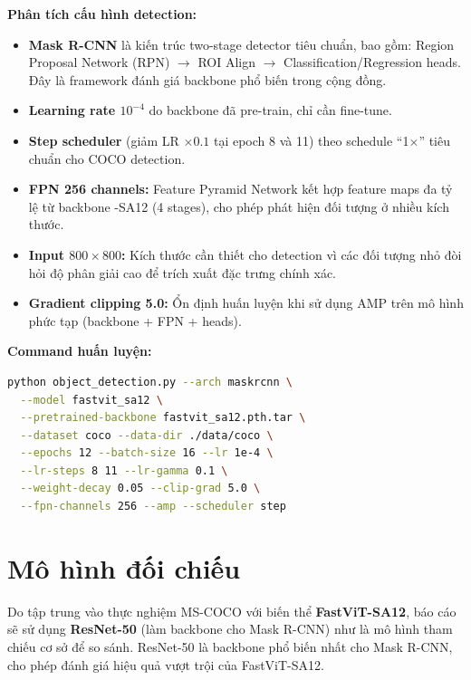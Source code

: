 \textbf{Phân tích cấu hình detection:}
\begin{itemize}
    \item \textbf{Mask R-CNN} là kiến trúc two-stage detector tiêu chuẩn, bao gồm: Region Proposal Network (RPN) $\to$ ROI Align $\to$ Classification/Regression heads. Đây là framework đánh giá backbone phổ biến trong cộng đồng.
    
    \item \textbf{Learning rate $10^{-4}$} do backbone đã pre-train, chỉ cần fine-tune.
    
    \item \textbf{Step scheduler} (giảm LR $\times 0.1$ tại epoch 8 và 11) theo schedule ``1$\times$'' tiêu chuẩn cho COCO detection.
    
    \item \textbf{FPN 256 channels:} Feature Pyramid Network kết hợp feature maps đa tỷ lệ từ backbone \fastvit{}-SA12 (4 stages), cho phép phát hiện đối tượng ở nhiều kích thước.
    
    \item \textbf{Input $800 \times 800$:} Kích thước cần thiết cho detection vì các đối tượng nhỏ đòi hỏi độ phân giải cao để trích xuất đặc trưng chính xác.
    
    \item \textbf{Gradient clipping 5.0:} Ổn định huấn luyện khi sử dụng AMP trên mô hình phức tạp (backbone + FPN + heads).
\end{itemize}

\textbf{Command huấn luyện:}
\begin{lstlisting}[language=bash, basicstyle=\ttfamily\scriptsize, breaklines=true]
python object_detection.py --arch maskrcnn \
  --model fastvit_sa12 \
  --pretrained-backbone fastvit_sa12.pth.tar \
  --dataset coco --data-dir ./data/coco \
  --epochs 12 --batch-size 16 --lr 1e-4 \
  --lr-steps 8 11 --lr-gamma 0.1 \
  --weight-decay 0.05 --clip-grad 5.0 \
  --fpn-channels 256 --amp --scheduler step
\end{lstlisting}

\section{Mô hình đối chiếu}
\label{sec:comparison_models}

Do tập trung vào thực nghiệm MS-COCO với biến thể \textbf{FastViT-SA12}, báo cáo sẽ sử dụng \textbf{ResNet-50} (làm backbone cho Mask R-CNN) như là mô hình tham chiếu cơ sở để so sánh. ResNet-50 là backbone phổ biến nhất cho Mask R-CNN, cho phép đánh giá hiệu quả vượt trội của FastViT-SA12.

